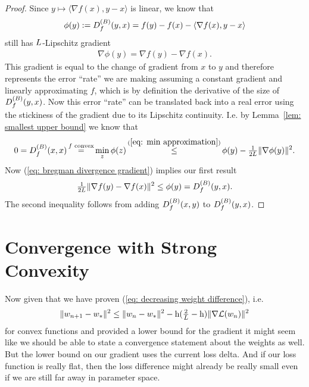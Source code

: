 \begin{proof}
	Since \(y\mapsto \langle\nabla f(x), y-x\rangle\) is linear, we know that
	\begin{align*}
		\phi(y):=D^{(B)}_{f}(y,x) = f(y)-f(x)-\langle \nabla f(x), y-x\rangle 
	\end{align*}
	still has \(L\)-Lipschitz gradient
	\begin{align}\label{eq: bregman divergence gradient}
		\nabla\phi(y) = \nabla f(y) - \nabla f(x).
	\end{align}
	This gradient is equal to the change of gradient from \(x\) to \(y\) and 
	therefore represents the error ``rate'' we are making assuming a constant gradient
	and linearly approximating \(f\), which is by definition the derivative of the size of
	\(D^{(B)}_{f}(y,x)\). Now this error ``rate'' can be translated
 	back into a real error using the stickiness of the gradient due to
	its Lipschitz continuity. I.e. by Lemma~\ref{lem: smallest upper bound} we know that
	\begin{align*}
		0 = \bregmanDiv{f}(x,x)
		\xeq{f\text{ convex}} \min_z\phi(z)
		\xle{(\ref{eq: min approximation})} \phi(y) - \tfrac{1}{2\ubound}\|\nabla \phi(y)\|^2.
	\end{align*}
	Now (\ref{eq: bregman divergence gradient}) implies our first result
	\begin{align*}
		\tfrac{1}{2L}\|\nabla f(y) - \nabla f(x)\|^2
		\le \phi(y) =D^{(B)}_{f}(y,x).
	\end{align*}
	The second inequality follows from adding \(D^{(B)}_{f}(x,y)\) to
	\(D^{(B)}_{f}(y,x)\).
\end{proof}



\section{Convergence with Strong Convexity}\label{sec: Strong Convexity}

Now given that we have proven (\ref{eq: decreasing weight difference}), i.e.
\begin{align*}
	\|w_{n+1}-w_*\|^2
	\le \|w_n - w_*\|^2 - \text{h}(\tfrac2{L} -\text{h})\|\nabla\mathcal{L}(w_n)\|^2
\end{align*}
for convex functions and provided a lower bound for the gradient it might seem
like we should be able to state a convergence statement about the weights as
well. But the lower bound on our gradient uses the current loss delta. And if
our loss function is really flat, then the loss difference might already be
really small even if we are still far away in parameter space.

